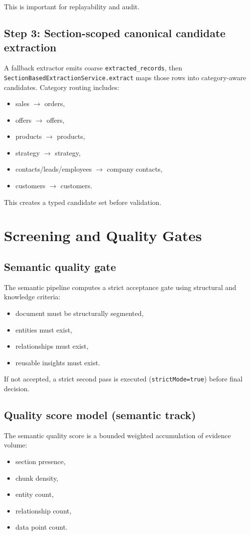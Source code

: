 \documentclass[11pt,a4paper]{article}
\begin{document}
This is important for replayability and audit.

\subsection{Step 3: Section-scoped canonical candidate extraction}
A fallback extractor emits coarse \texttt{extracted\_records}, then \texttt{SectionBasedExtractionService.extract} maps those rows into category-aware candidates. Category routing includes:
\begin{itemize}[leftmargin=*]
  \item sales $\rightarrow$ orders,
  \item offers $\rightarrow$ offers,
  \item products $\rightarrow$ products,
  \item strategy $\rightarrow$ strategy,
  \item contacts/leads/employees $\rightarrow$ company contacts,
  \item customers $\rightarrow$ customers.
\end{itemize}

This creates a typed candidate set before validation.

\section{Screening and Quality Gates}
\subsection{Semantic quality gate}
The semantic pipeline computes a strict acceptance gate using structural and knowledge criteria:
\begin{itemize}[leftmargin=*]
  \item document must be structurally segmented,
  \item entities must exist,
  \item relationships must exist,
  \item reusable insights must exist.
\end{itemize}

If not accepted, a strict second pass is executed (\texttt{strictMode=true}) before final decision.

\subsection{Quality score model (semantic track)}
The semantic quality score is a bounded weighted accumulation of evidence volume:
\begin{itemize}[leftmargin=*]
  \item section presence,
  \item chunk density,
  \item entity count,
  \item relationship count,
  \item data point count.
\end{itemize}
\end{document}
